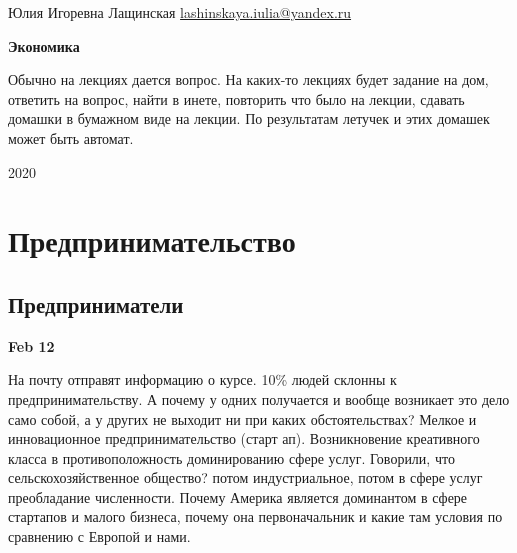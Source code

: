 \documentclass[a4paper, 12pt]{article}
\def\datee#1{\hfill\textbf{#1} \par}
\def\mailto#1{\href{mailto:#1}{#1}}
\begin{document}
\thispagestyle{empty}
\noindent 
Юлия Игоревна Лащинская 
\hfill
\mailto{lashinskaya.iulia@yandex.ru}
\\

\vfill

\begin{center}
\Large\bf
Экономика
\end{center}

Обычно на лекциях дается вопрос. На каких-то лекциях будет задание на дом, ответить на вопрос, найти в инете, повторить что было на лекции, сдавать домашки в бумажном виде на лекции. По результатам летучек и этих домашек может быть автомат. 

\vfill

\begin{center}
2020
\end{center}

\clearpage
\tableofcontents
\clearpage


\section{Предпринимательство}

\subsection{Предприниматели}

\datee{Feb 12}

На почту отправят информацию о курсе. 10\% людей склонны к предпринимательству. А почему у одних получается и вообще возникает это дело само собой, а у других не выходит ни при каких обстоятельствах? Мелкое и инновационное предпринимательство (старт ап). Возникновение креативного класса в противоположность доминированию сфере услуг. Говорили, что сельскохозяйственное общество? потом индустриальное, потом в сфере услуг преобладание численности. Почему Америка является доминантом в сфере стартапов и малого бизнеса, почему она первоначальник и какие там условия по сравнению с Европой и нами. 
\end{document}
